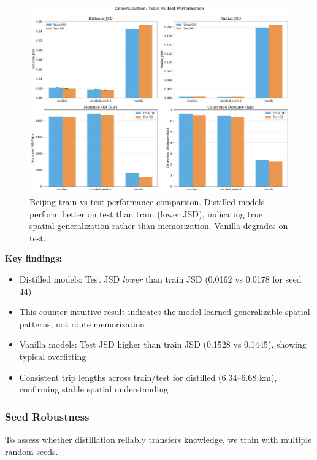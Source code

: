 \begin{figure}[t]
    \centering
    \includegraphics[width=0.8\linewidth]{assets/plots/eval/beijing/train_test_comparison.pdf}
    \caption{Beijing train vs test performance comparison. Distilled models perform better on test than train (lower JSD), indicating true spatial generalization rather than memorization. Vanilla degrades on test.}
    \label{fig:beijing-train-test}
\end{figure}

\textbf{Key findings:}
\begin{itemize}[noitemsep,topsep=0pt]
    \item Distilled models: Test JSD \emph{lower} than train JSD (0.0162 vs 0.0178 for seed 44)
    \item This counter-intuitive result indicates the model learned generalizable spatial patterns, not route memorization
    \item Vanilla models: Test JSD higher than train JSD (0.1528 vs 0.1445), showing typical overfitting
    \item Consistent trip lengths across train/test for distilled (6.34--6.68 km), confirming stable spatial understanding
\end{itemize}

\subsubsection{Seed Robustness}

To assess whether distillation reliably transfers knowledge, we train with multiple random seeds.

